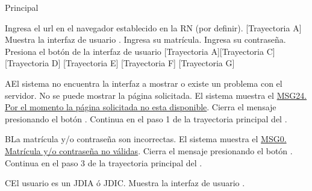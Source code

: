 \begin{UCtrayectoria}{Principal}
    
    \UCpaso[\UCactor] Ingresa el url en el navegador establecido en la RN (por definir). [Trayectoria A] 
    \UCpaso Muestra la interfaz de usuario .
    \UCpaso[\UCactor] Ingresa su matrícula.
    \UCpaso[\UCactor] Ingresa su contraseña.
    \UCpaso[\UCactor] Presiona el botón  de la interfaz de usuario   [Trayectoria A][Trayectoria C] [Trayectoria D] [Trayectoria E] [Trayectoria F] [Trayectoria G]
\end{UCtrayectoria}


\begin{UCtrayectoriaA}{A}{El sistema no encuentra la interfaz a mostrar o existe un problema con el servidor.}
    \UCpaso No se puede mostrar la página solicitada.
    \UCpaso El sistema muestra el \hyperref[MSG24]{MSG24. Por el momento la página solicitada no esta disponible}.
    \UCpaso[\UCactor] Cierra el mensaje presionando el botón .
    \UCpaso Continua en el paso 1 de la trayectoria principal del .
\end{UCtrayectoriaA}


\begin{UCtrayectoriaA}{B}{La matrícula y/o contraseña son incorrectas.}
    \UCpaso El sistema muestra el  \hyperref[MSG0]{MSG0. Matrícula y/o contraseña no válidas}.
    \UCpaso[\UCactor] Cierra el mensaje presionando el botón .
    \UCpaso Continua en el paso 3 de la trayectoria principal del .
\end{UCtrayectoriaA}



\begin{UCtrayectoriaA}{C}{El usuario es un JDIA ó JDIC.}
    \UCpaso Muestra la interfaz de usuario .
\end{UCtrayectoriaA}


